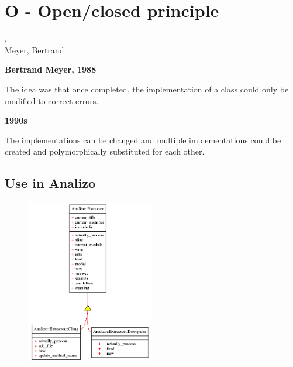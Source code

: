 

\section{O - Open/closed principle} %
\label{sec:o}

\begin{frame}
	, \\Meyer, Bertrand
\end{frame}

\begin{frame}


\begin{Parallel}[v]{5cm}{5cm}
    \ParallelLText%
    {
    	\textbf{Bertrand Meyer, 1988}

    	The idea was that once completed, the implementation of a class could only be modified to correct errors.
    }
    \ParallelRText%
    {
    	\textbf{1990s}

    	The implementations can be changed and multiple implementations could be created and polymorphically substituted for each other.
	}
\end{Parallel}

\end{frame}

\subsection{Use in Analizo} %
\label{sub:use_in_analizo}
\begin{frame}

\begin{figure}[h!]
  \centering
    \includegraphics[width=0.5\textwidth]{conteudo/Extractor}
\end{figure}
    
\end{frame}



